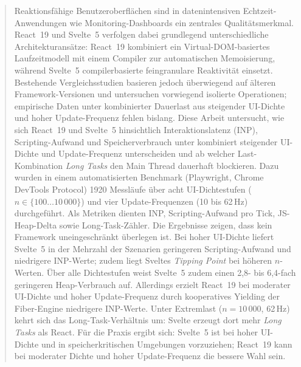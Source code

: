 \begin{abstract}
Reaktionsfähige Benutzeroberflächen sind in datenintensiven Echtzeit-Anwendungen wie Monitoring-Dashboards ein zentrales Qualitätsmerkmal. React~19 und Svelte~5 verfolgen dabei grundlegend unterschiedliche Architekturansätze: React~19 kombiniert ein Virtual-DOM-basiertes Laufzeitmodell mit einem Compiler zur automatischen Memoisierung, während Svelte~5 compilerbasierte feingranulare Reaktivität einsetzt. Bestehende Vergleichsstudien basieren jedoch überwiegend auf älteren Framework-Versionen und untersuchen vorwiegend isolierte Operationen; empirische Daten unter kombinierter Dauerlast aus steigender UI-Dichte und hoher Update-Frequenz fehlen bislang. Diese Arbeit untersucht, wie sich React~19 und Svelte~5 hinsichtlich Interaktionslatenz (INP), Scripting-Aufwand und Speicherverbrauch unter kombiniert steigender UI-Dichte und Update-Frequenz unterscheiden und ab welcher Last-Kombination \textit{Long Tasks} den Main Thread dauerhaft blockieren. Dazu wurden in einem automatisierten Benchmark (Playwright, Chrome DevTools Protocol) 1920 Messläufe über acht UI-Dichtestufen ($n \in \{100 \ldots 10\,000\}$) und vier Update-Frequenzen (10 bis 62\,Hz) durchgeführt. Als Metriken dienten INP, Scripting-Aufwand pro Tick, JS-Heap-Delta sowie Long-Task-Zähler. Die Ergebnisse zeigen, dass kein Framework uneingeschränkt überlegen ist. Bei hoher UI-Dichte liefert Svelte~5 in der Mehrzahl der Szenarien geringeren Scripting-Aufwand und niedrigere INP-Werte; zudem liegt Sveltes \textit{Tipping Point} bei höheren $n$-Werten. Über alle Dichtestufen weist Svelte~5 zudem einen 2,8- bis 6,4-fach geringeren Heap-Verbrauch auf. Allerdings erzielt React~19 bei moderater UI-Dichte und hoher Update-Frequenz durch kooperatives Yielding der Fiber-Engine niedrigere INP-Werte. Unter Extremlast ($n = 10\,000$, 62\,Hz) kehrt sich das Long-Task-Verhältnis um: Svelte erzeugt dort mehr \textit{Long Tasks} als React. Für die Praxis ergibt sich: Svelte~5 ist bei hoher UI-Dichte und in speicherkritischen Umgebungen vorzuziehen; React~19 kann bei moderater Dichte und hoher Update-Frequenz die bessere Wahl sein.
\end{abstract}

